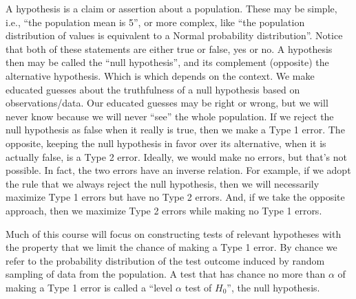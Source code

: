 \documentclass[
]{book}
\begin{document}
A hypothesis is a claim or assertion about a population. These may be simple, i.e., ``the population mean is 5'', or more complex, like ``the population distribution of values is equivalent to a Normal probability distribution''. Notice that both of these statements are either true or false, yes or no. A hypothesis then may be called the ``null hypothesis'', and its complement (opposite) the alternative hypothesis. Which is which depends on the context. We make educated guesses about the truthfulness of a null hypothesis based on observations/data. Our educated guesses may be right or wrong, but we will never know because we will never ``see'' the whole population. If we reject the null hypothesis as false when it really is true, then we make a Type 1 error. The opposite, keeping the null hypothesis in favor over its alternative, when it is actually false, is a Type 2 error. Ideally, we would make no errors, but that's not possible. In fact, the two errors have an inverse relation. For example, if we adopt the rule that we always reject the null hypothesis, then we will necessarily maximize Type 1 errors but have no Type 2 errors. And, if we take the opposite approach, then we maximize Type 2 errors while making no Type 1 errors.

Much of this course will focus on constructing tests of relevant hypotheses with the property that we limit the chance of making a Type 1 error. By chance we refer to the probability distribution of the test outcome induced by random sampling of data from the population. A test that has chance no more than \(\alpha\) of making a Type 1 error is called a ``level \(\alpha\) test of \(H_0\)'', the null hypothesis.

  
\end{document}
